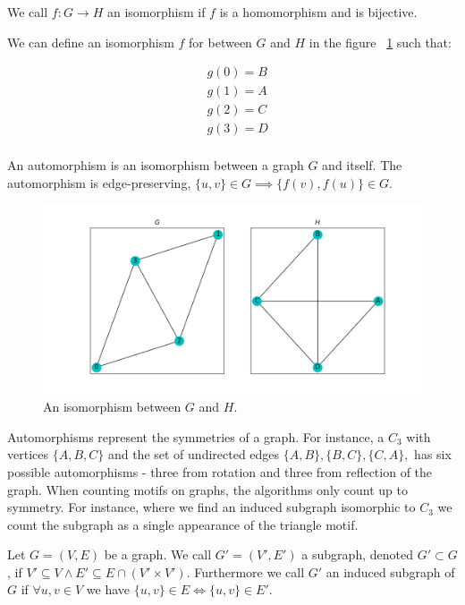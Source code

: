 \begin{dfn}
    We call $f: G \rightarrow H$ an isomorphism
 if $f$ is a homomorphism and is bijective.
\end{dfn}

\noindent We can define an isomorphism $f$ for between $G$ and $H$ in the figure ~\ref{fig:isomorphism} such that:

\begin{align*}
    &g(0) = B\\
    &g(1) = A\\
    &g(2) = C\\
    &g(3) = D\\ 
\end{align*}

\begin{dfn}
    An automorphism is an isomorphism between a graph $G$ and itself. The automorphism 
    is edge-preserving, $\{u,v\} \in G \implies \{f(v),f(u)\} \in G$.
\end{dfn}

\begin{figure}[h!]
    \includegraphics[width=12cm]{Images/graph_isomoprhism.png}
    \centering
    \caption{An isomorphism between $G$ and $H$.}
    \label{fig:isomorphism}
\end{figure}

Automorphisms represent the symmetries of a graph. For instance, a $C_3$ with vertices $\{A, B, C\}$
and the set of undirected edges $\{A,B\},\{B,C\},\{C,A\},$ has six possible automorphisms - three from rotation 
and three from reflection of the graph. When counting motifs on graphs, the algorithms only count up to symmetry.
For instance, where we find an induced subgraph isomorphic to $C_3$ we count the subgraph as a
 single appearance of the triangle motif. 


\begin{dfn}
    Let $G=(V,E)$ be a graph. We call $G'=(V',E')$ a subgraph, denoted $G' \subset G$, if
     $V' \subseteq V \land E' \subseteq E \cap (V' \times V')$. Furthermore we call $G'$
     an induced subgraph of $G$ if $\forall u,v \in V$ we have $\{u,v\} \in E \iff \{u,v\} \in E'$.
\end{dfn}

